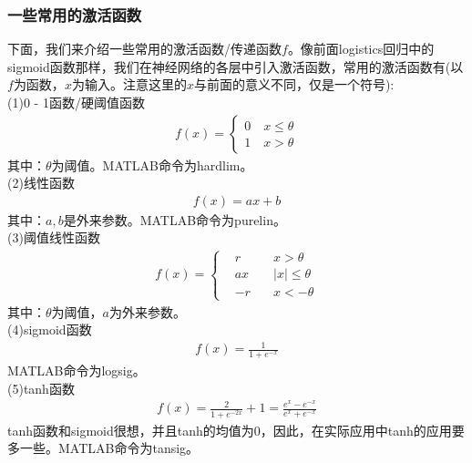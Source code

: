         \subsubsection{一些常用的激活函数}
            \par
            下面，我们来介绍一些常用的激活函数/传递函数$f$。像前面logistics回归中的sigmoid函数那样，我们在神经网络的各层中引入激活函数，常用的激活函数有(以$f$为函数，$x$为输入。注意这里的$x$与前面的意义不同，仅是一个符号):\\
            (1)0 - 1函数/硬阈值函数
            \begin{align*}
            f(x) =
            \left\{
            \begin{aligned}
            0 \quad x \leqslant \theta\\
            1 \quad x > \theta
            \end{aligned}
            \right.
            \end{align*}
            其中：$\theta$为阈值。MATLAB命令为hardlim。\\
            (2)线性函数
            \begin{align*}
            f(x) =ax+b
            \end{align*}
            其中：$a,b$是外来参数。MATLAB命令为purelin。\\
            (3)阈值线性函数
            \begin{align*}
            f(x) =
            \left\{
            \begin{aligned}
            & r &\quad x >\theta\\
            & ax&\quad |x|  \leqslant \theta\\
            & -r&\quad x<-\theta
            \end{aligned}
            \right.
            \end{align*}
            其中：$\theta$为阈值，$a$为外来参数。\\
            (4)sigmoid函数
            \begin{align*}
            f(x) = \frac{1}{1+e^{-x}}
            \end{align*}
            MATLAB命令为logsig。\\
            (5)tanh函数
            \begin{align*}
            f(x) = \frac{2}{1+e^{-2x}}+1 = \frac{e^{x}-e^{-x}}{e^x+e^{-x}}
            \end{align*}
            tanh函数和sigmoid很想，并且tanh的均值为0，因此，在实际应用中tanh的应用要多一些。MATLAB命令为tansig。\\
